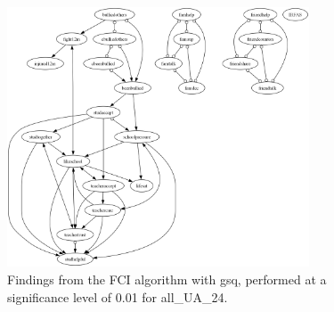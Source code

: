 \begin{figure}[htbp]
    \centering
    \includegraphics[width=0.8\textwidth]{Report/final_report/pictures/FCI_gsq_0.01_all_UA_24.png}
    \caption{Findings from the FCI algorithm with gsq, performed at a significance level of 0.01 for all_UA_24.}
    \label{fig:fci_gsq_0.01all_UA_24}
\end{figure}
